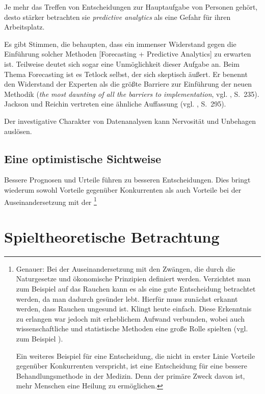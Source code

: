 
Je mehr das Treffen von Entscheidungen zur Hauptaufgabe von Personen gehört,
desto stärker betrachten sie \emph{predictive analytics} als eine Gefahr für
ihren Arbeitsplatz.

Es gibt Stimmen, die behaupten, dass ein immenser Widerstand gegen die
Einführung solcher Methoden [Forecasting + Predictive Analytics] zu erwarten
ist. Teilweise deutet sich sogar eine Unmöglichkeit dieser Aufgabe an. Beim 
Thema Forecasting ist es Tetlock selbst, der sich skeptisch äußert. Er
benennt den Widerstand der Experten als die größte Barriere zur Einführung der
neuen Methodik (\emph{the most daunting of all the barriers to implementation},
vgl. \cite{Tetlock}, S.~235). Jackson und Reichin vertreten eine ähnliche
Auffassung (vgl. \cite{Jackson}, S.~295).

Der investigative Charakter von Datenanalysen kann Nervosität und Unbehagen
auslösen.

\subsection{Eine optimistische Sichtweise}


Bessere Prognosen und Urteile führen zu besseren Entscheidungen. Dies bringt
wiederum sowohl Vorteile gegenüber Konkurrenten als auch Vorteile bei der
Auseinandersetzung mit der \grqq\footnote{
Genauer: Bei der Auseinandersetzung mit den Zwängen, die durch die Naturgesetze
und ökonomische Prinzipien definiert werden. Verzichtet man zum Beispiel auf das 
Rauchen kann es als eine gute Entscheidung betrachtet werden, da man dadurch
gesünder lebt. Hierfür muss zunächst erkannt werden, dass Rauchen ungesund ist.
Klingt heute einfach. Diese Erkenntnis zu erlangen war jedoch mit erheblichem
Aufwand verbunden, wobei auch wissenschaftliche und statistische Methoden
eine große Rolle spielten (vgl. zum Beispiel \cite{Proctor}).

Ein weiteres Beispiel für eine Entscheidung, die nicht in erster Linie Vorteile
gegenüber Konkurrenten verspricht, ist eine Entscheidung für eine bessere
Behandlungsmethode in der Medizin. Denn der primäre Zweck davon ist, 
mehr Menschen eine Heilung zu ermöglichen.
}

\section{Spieltheoretische Betrachtung}

